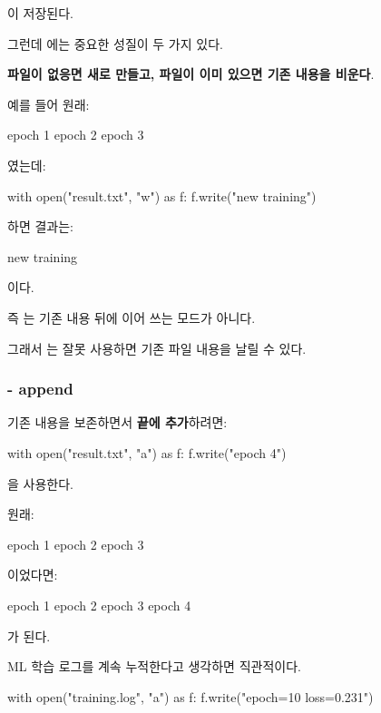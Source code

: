이 저장된다.

그런데 에는 중요한 성질이 두 가지 있다.

\textbf{파일이 없응면 새로 만들고, 파일이 이미 있으면 기존 내용을 비운다}.

예를 들어 원래:

\begin{dhkcode}
epoch 1
epoch 2
epoch 3
\end{dhkcode}

였는데:

\begin{dhkcode}
with open("result.txt", "w") as f:
    f.write("new training")
\end{dhkcode}

하면 결과는:

\begin{dhkzsh}
new training
\end{dhkzsh}

이다.

즉 는 기존 내용 뒤에 이어 쓰는 모드가 아니다.

그래서 는 잘못 사용하면 기존 파일 내용을 날릴 수 있다.

\subsubsection{ - append}

기존 내용을 보존하면서 \textbf{끝에 추가}하려면:

\begin{dhkcode}
with open("result.txt", "a") as f:
    f.write("epoch 4\n")
\end{dhkcode}

을 사용한다.

원래:

\begin{dhkzsh}
epoch 1
epoch 2
epoch 3
\end{dhkzsh}

이었다면:

\begin{dhkzsh}
epoch 1
epoch 2
epoch 3
epoch 4
\end{dhkzsh}

가 된다.

ML 학습 로그를 계속 누적한다고 생각하면 직관적이다.

\begin{dhkcode}
with open("training.log", "a") as f:
    f.write("epoch=10 loss=0.231\n")
\end{dhkcode}


